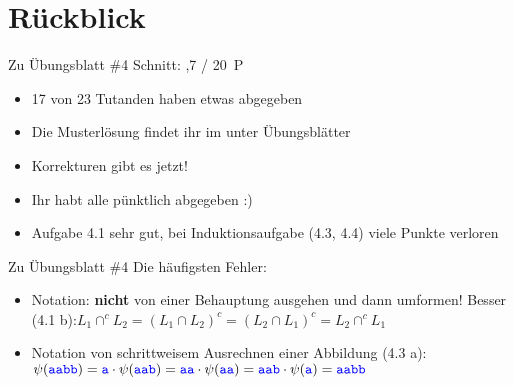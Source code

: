 
\newcommand{\handout}{}



\morescalingdelimiters



\section{Rückblick}

\begin{frame}{Zu Übungsblatt \#4}
	Schnitt: ,7 / 20~P

	\begin{itemize}[<+->]
		\item 17 von 23 Tutanden haben etwas abgegeben
		\item Die Musterlösung findet ihr im \ILIAS unter Übungsblätter
		\item Korrekturen gibt es jetzt!
		\item Ihr habt alle pünktlich abgegeben :)
		\item Aufgabe 4.1 sehr gut, bei Induktionsaufgabe (4.3, 4.4) viele Punkte verloren
	\end{itemize}
\end{frame}

\begin{frame}{Zu Übungsblatt \#4}
	Die häufigsten Fehler:
	\begin{itemize}[<+->]
		\item Notation: \textbf{nicht} von einer Behauptung ausgehen und dann umformen!
		\implitem Besser (4.1 b):\quad $L_1 \cap^c L_2 = (L_1 \cap L_2)^c = (L_2 \cap L_1)^c = L_2 \cap^c L_1$ 
		\item Notation von schrittweisem Ausrechnen einer Abbildung (4.3 a):
		\implitem $\psi(\hbox{\textcolor{blue}{\texttt{aabb}}}) = \hbox{\textcolor{blue}{\texttt{a}}} \cdot \psi(\hbox{\textcolor{blue}{\texttt{aab}}}) = \hbox{\textcolor{blue}{\texttt{aa}}} \cdot \psi(\hbox{\textcolor{blue}{\texttt{aa}}}) = \hbox{\textcolor{blue}{\texttt{aab}}} \cdot \psi(\hbox{\textcolor{blue}{\texttt{a}}}) = \hbox{\textcolor{blue}{\texttt{aabb}}}$
	\end{itemize}
\end{frame}


